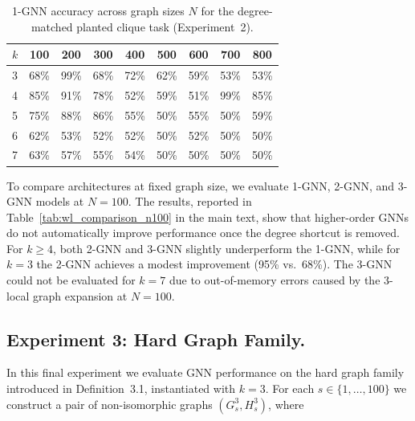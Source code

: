 \begin{table}[h]
\centering
\begin{tabular}{lcccccccc}
\toprule
\textbf{$k$} & \textbf{100} & \textbf{200} & \textbf{300} & \textbf{400} & \textbf{500} & \textbf{600} & \textbf{700} & \textbf{800} \\
\midrule
3 & 68\% & 99\% & 68\% & 72\% & 62\% & 59\% & 53\% & 53\% \\
4 & 85\% & 91\% & 78\% & 52\% & 59\% & 51\% & 99\% & 85\% \\
5 & 75\% & 88\% & 86\% & 55\% & 50\% & 55\% & 50\% & 59\% \\
6 & 62\% & 53\% & 52\% & 52\% & 50\% & 52\% & 50\% & 50\% \\
7 & 63\% & 57\% & 55\% & 54\% & 50\% & 50\% & 50\% & 50\% \\
\bottomrule
\end{tabular}
\caption{1-GNN accuracy across graph sizes $N$ for the degree-matched planted clique task (Experiment~2).}
\label{tab:exp2_1gnn_results}
\end{table}


To compare architectures at fixed graph size, we evaluate 1-GNN, 2-GNN, and 3-GNN models at $N = 100$. The results, reported in Table~\ref{tab:wl_comparison_n100} in the main text, show that higher-order GNNs do not automatically improve performance once the degree shortcut is removed. For $k \ge 4$, both 2-GNN and 3-GNN slightly underperform the 1-GNN, while for $k = 3$ the 2-GNN achieves a modest improvement (95\% vs.\ 68\%). The 3-GNN could not be evaluated for $k = 7$ due to out-of-memory errors caused by the 3-local graph expansion at $N = 100$.


\subsection{Experiment 3: Hard Graph Family.}\label{app:Experiment3}
In this final experiment we evaluate GNN performance on the hard graph family introduced in Definition~3.1, instantiated with $k = 3$. For each $s \in \{1,\ldots,100\}$ we construct a pair of non-isomorphic graphs $(G^3_s, H^3_s)$, where


